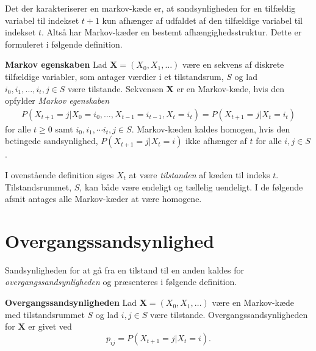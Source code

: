 
Det der karakteriserer en markov-kæde er, at sandsynligheden for en tilfældig variabel til indekset $t+1$ kun afhænger af udfaldet af den tilfældige variabel til indekset $t$. Altså har Markov-kæder en bestemt afhængighedsstruktur. Dette er formuleret i følgende definition.

\begin{minipage}\textwidth
\begin{defn}\label{def:markov-egenskab} \textbf{Markov egenskaben} %
\newline
Lad $\bm{X}=(X_0, X_1, \dots)$ være en sekvens af diskrete tilfældige variabler, som antager værdier i et tilstandsrum, $S$ og lad $i_0, i_1, \ldots, i_{t}, j\in S$ være tilstande. 
Sekvensen $\bm{X}$ er en Markov-kæde, hvis den opfylder \textit{Markov egenskaben}
\begin{align}\label{eq:markov_egenskaben}
    P(X_{t+1} = j | X_0 = i_0, \dots, X_{t-1} = i_{t-1}, X_t = i_t) =  P(X_{t+1} = j | X_t = i_t)
\end{align}
for alle $t\geq 0$ samt $i_0, i_1, \cdots i_{t}, j\in S$.
Markov-kæden kaldes homogen, hvis den betingede sandsynlighed, $P(X_{t+1}=j|X_t=i)$ ikke afhænger af $t$ for alle $i,j\in S$.
\end{defn}
\end{minipage}

I ovenstående definition siges $X_t$ at være \textit{tilstanden} af kæden til indeks $t$. Tilstandsrummet, $S$, kan både være endeligt og tællelig uendeligt. I de følgende afsnit antages alle Markov-kæder at være homogene.


\section{Overgangssandsynlighed}
Sandsynligheden for at gå fra en tilstand til en anden  kaldes for \textit{overgangssandsynligheden} og præsenteres i følgende definition.

\begin{minipage}\textwidth
\begin{defn}\textbf{Overgangssandsynligheden} \label{def:overgangssandsynlighed} %
\newline
Lad $\bm X = (X_0, X_1, \ldots)$ være en Markov-kæde med tilstandsrummet $S$ og lad $i,j\in S$ være tilstande. Overgangssandsynligheden for $\bm X$ er givet ved $$p_{ij}=P(X_{t+1}=j|X_t=i).$$
\end{defn}
\end{minipage}

